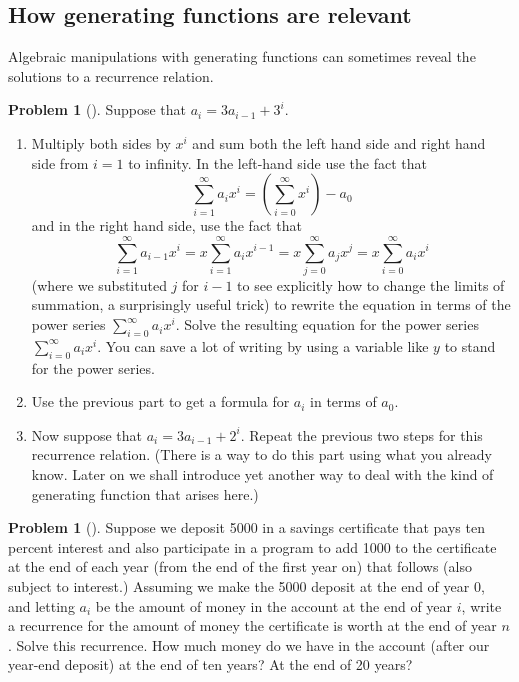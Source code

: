 \documentclass[10pt,]{book}
\theoremstyle{plain}
\theoremstyle{definition}
\newtheorem{activity}[project]{Problem}
\theoremstyle{definition}
\numberwithin{equation}{chapter}
\begin{document}
\subsection[{How generating functions are relevant}]{How generating functions are relevant}\label{subsection-46}
Algebraic manipulations with generating functions can sometimes reveal the solutions to a recurrence relation.%
\begin{activity}[] \label{substituteandsolve}
Suppose that \(a_i=3a_{i-1} + 3^i\).%
\begin{enumerate}[font=\bfseries,label=(\alph*),ref=\alph*]
\item\label{task-157} \marginsymbol[-2.5em]{} Multiply both sides by \(x^i\) and sum both the left hand side and right hand side from \(i=1\) to infinity.  In the left-hand side use the fact that%
\begin{equation*}
\sum_{i=1}^\infty a_ix^i = (\sum_{i=0}^\infty x^i) -a_0
\end{equation*}
and in the right hand side, use the fact that%
\begin{equation*}
\sum_{i=1}^\infty a_{i-1}x^i = x\sum_{i=1}^\infty a_ix^{i-1}
=x\sum_{j=0}^\infty a_jx^j =x\sum_{i=0}^\infty a_ix^i
\end{equation*}
(where we substituted \(j\) for \(i-1\) to see explicitly how to change the limits of summation, a surprisingly useful trick) to rewrite the equation in terms of the power series \(\sum_{i=0}^\infty a_ix^i\).  Solve the resulting equation for the power series \(\sum_{i=0}^\infty a_ix^i\). You can save a lot of writing by using a variable like \(y\) to stand for the power series.%
\item\label{task-158} \marginsymbol[-2.5em]{} Use the previous part to get a formula for \(a_i\) in terms of \(a_0\).%
\item\label{task-159} \marginsymbol[-2.5em]{} Now suppose that \(a_i=3a_{i-1} + 2^i\).  Repeat the previous two steps for this recurrence relation.  (There is a way to do this part using what you already know.  Later on we shall introduce yet another way to deal with the kind of generating function that arises here.)%
\end{enumerate}
\end{activity}
\begin{activity}[] \label{activity-212}
Suppose we deposit \textdollar{}5000 in a savings certificate that pays ten percent interest and also participate in a program to add \textdollar{}1000 to the certificate at the end of each year (from the end of the first year on) that follows (also subject to interest.) Assuming we make the \textdollar{}5000 deposit at the end of year 0, and letting \(a_i\) be the amount of money in the account at the end of year \(i\), write a recurrence for the amount of money the certificate is worth at the end of year \(n\). Solve this recurrence. How much money do we have in the account (after our year-end deposit) at the end of ten years?  At the end of 20 years?%
\end{activity}
\typeout{************************************************}
\typeout{************************************************}
\end{document}
